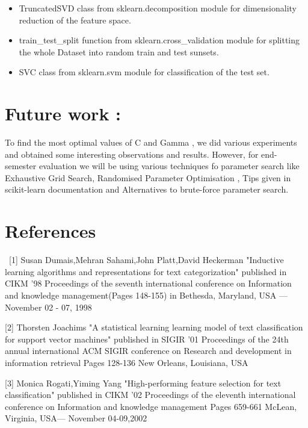 \documentclass{report}
\begin{document}
\begin{multicols}{2}
\begin{itemize}
\item TruncatedSVD class from sklearn.decomposition module for dimensionality reduction of the feature space.

\item train\_test\_split function from sklearn.cross\_validation module for splitting the whole Dataset into random train and test sunsets.

\item SVC class from sklearn.svm module for classification of the test set.
\end{itemize}
\section {\huge Future work :}
To find the most optimal values of C and Gamma , we did various experiments and obtained some interesting observations and results. However, for end-semester evaluation we will be using various techniques fo parameter search like Exhaustive Grid Search, Randomised Parameter Optimisation , Tips given in scikit-learn documentation and Alternatives to brute-force parameter search.
\linebreak
\end{multicols}
\pagebreak
\section{\huge References}
\quad \  [1] Susan Dumais,Mehran Sahami,John Platt,David Heckerman "Inductive learning algorithms and representations for text categorization" published in CIKM '98 Proceedings of the seventh international conference on Information and knowledge management(Pages 148-155) in Bethesda, Maryland, USA — November 02 - 07, 1998\\
\linebreak

[2] Thorsten Joachims "A statistical learning learning model of text classification for support vector machines" published in SIGIR '01 Proceedings of the 24th annual international ACM SIGIR conference on Research and development in information retrieval Pages 128-136 New Orleans, Louisiana, USA\\ 
\linebreak

[3] Monica Rogati,Yiming Yang "High-performing feature selection for text classification" published in CIKM '02 Proceedings of the eleventh international conference on Information and knowledge management Pages 659-661 McLean, Virginia, USA— November 04-09,2002\\
\linebreak
\end{document}
